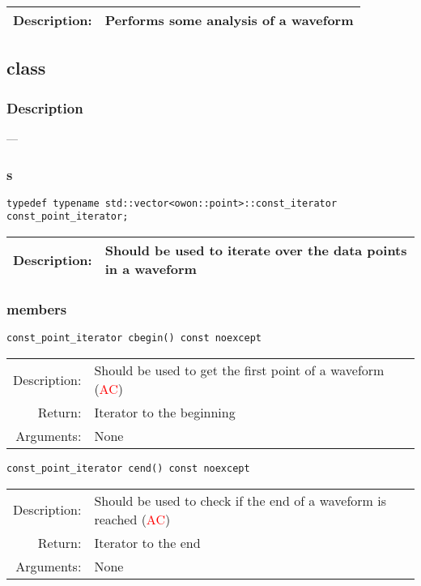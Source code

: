\begin{tabularx}{0.9\textwidth}{rp{11cm}}
\toprule
    Description:    & Performs some analysis of a waveform\\
\bottomrule
\end{tabularx}
\vspace{1cm}

\newpage
\subsection{class }\label{ssec:ref:osc}
\subsubsection*{Description}

\hspace{\parindent} --- 

\subsubsection*{s}
\begin{lstlisting}
typedef typename std::vector<owon::point>::const_iterator const_point_iterator;  
\end{lstlisting}
\begin{tabularx}{0.9\textwidth}{rp{11cm}}
\toprule
    Description: & Should be used to iterate over the data points in a waveform\\
\bottomrule
\end{tabularx}
\vspace{1cm}

\subsubsection*{ members}
\begin{lstlisting}
const_point_iterator cbegin() const noexcept
\end{lstlisting}
\begin{tabularx}{\textwidth}{rp{11cm}}
    \toprule
    Description: & Should be used to get the first point of a waveform (\textcolor{red}{AC})\\
    Return: & Iterator to the beginning\\
    Arguments: & None\\
    \bottomrule
\end{tabularx}
\vspace{1cm}

\begin{lstlisting}
const_point_iterator cend() const noexcept
\end{lstlisting}
\begin{tabularx}{\textwidth}{rp{11cm}}
    \toprule
    Description: & Should be used to check if the end of a waveform is reached (\textcolor{red}{AC})\\
    Return: & Iterator to the end\\
    Arguments: & None\\
    \bottomrule
\end{tabularx}
\vspace{1cm}

